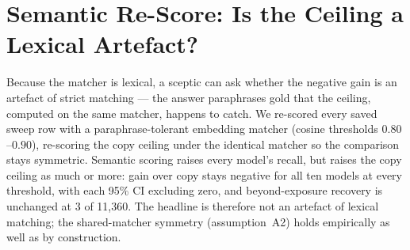 \documentclass[10pt,twocolumn]{article}
\begin{document}
\section{Semantic Re-Score: Is the Ceiling a Lexical Artefact?}\label{sec:rescore}
Because the matcher is lexical, a sceptic can ask whether the negative gain is an artefact of strict matching --- the answer paraphrases gold that the ceiling, computed on the same matcher, happens to catch. We re-scored every saved sweep row with a paraphrase-tolerant embedding matcher (cosine thresholds $0.80$--$0.90$), re-scoring the copy ceiling under the identical matcher so the comparison stays symmetric. Semantic scoring raises every model's recall, but raises the copy ceiling as much or more: gain over copy stays negative for all ten models at every threshold, with each 95\% CI excluding zero, and beyond-exposure recovery is unchanged at 3 of 11{,}360. The headline is therefore not an artefact of lexical matching; the shared-matcher symmetry (assumption~A2) holds empirically as well as by construction.
\end{document}
